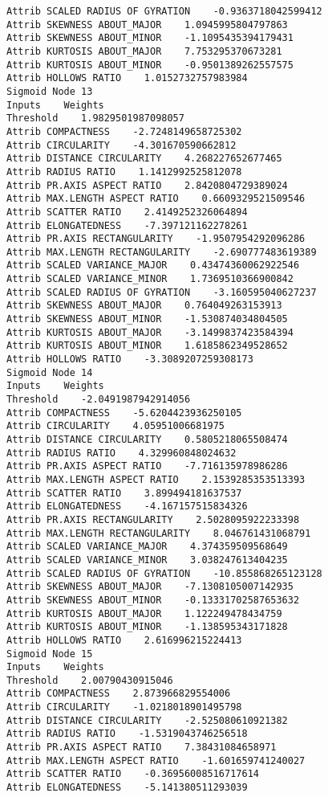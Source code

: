 \documentclass[
	article,			%
	11pt,				%
	oneside,			%
	a4paper,			%
	english,			%
	brazil,				%
	sumario=tradicional
	]{abntex2}
\begin{document}
\begin{lstlisting}
Attrib SCALED RADIUS OF GYRATION    -0.9363718042599412
Attrib SKEWNESS ABOUT_MAJOR    1.0945995804797863
Attrib SKEWNESS ABOUT_MINOR    -1.1095435394179431
Attrib KURTOSIS ABOUT_MAJOR    7.753295370673281
Attrib KURTOSIS ABOUT_MINOR    -0.9501389262557575
Attrib HOLLOWS RATIO    1.0152732757983984
Sigmoid Node 13
Inputs    Weights
Threshold    1.9829501987098057
Attrib COMPACTNESS    -2.7248149658725302
Attrib CIRCULARITY    -4.301670590662812
Attrib DISTANCE CIRCULARITY    4.268227652677465
Attrib RADIUS RATIO    1.1412992525812078
Attrib PR.AXIS ASPECT RATIO    2.8420804729389024
Attrib MAX.LENGTH ASPECT RATIO    0.6609329521509546
Attrib SCATTER RATIO    2.4149252326064894
Attrib ELONGATEDNESS    -7.397121162278261
Attrib PR.AXIS RECTANGULARITY    -1.9507954292096286
Attrib MAX.LENGTH RECTANGULARITY    -2.690777483619389
Attrib SCALED VARIANCE_MAJOR    0.43474360062922546
Attrib SCALED VARIANCE_MINOR    1.7369510366900842
Attrib SCALED RADIUS OF GYRATION    -3.160595040627237
Attrib SKEWNESS ABOUT_MAJOR    0.764049263153913
Attrib SKEWNESS ABOUT_MINOR    -1.530874034804505
Attrib KURTOSIS ABOUT_MAJOR    -3.1499837423584394
Attrib KURTOSIS ABOUT_MINOR    1.6185862349528652
Attrib HOLLOWS RATIO    -3.3089207259308173
Sigmoid Node 14
Inputs    Weights
Threshold    -2.0491987942914056
Attrib COMPACTNESS    -5.6204423936250105
Attrib CIRCULARITY    4.05951006681975
Attrib DISTANCE CIRCULARITY    0.5805218065508474
Attrib RADIUS RATIO    4.329960848024632
Attrib PR.AXIS ASPECT RATIO    -7.716135978986286
Attrib MAX.LENGTH ASPECT RATIO    2.1539285353513393
Attrib SCATTER RATIO    3.899494181637537
Attrib ELONGATEDNESS    -4.167157515834326
Attrib PR.AXIS RECTANGULARITY    2.5028095922233398
Attrib MAX.LENGTH RECTANGULARITY    8.046761431068791
Attrib SCALED VARIANCE_MAJOR    4.374359509568649
Attrib SCALED VARIANCE_MINOR    3.038247613404235
Attrib SCALED RADIUS OF GYRATION    -10.855868265123128
Attrib SKEWNESS ABOUT_MAJOR    -7.1308105007142935
Attrib SKEWNESS ABOUT_MINOR    -0.13331702587653632
Attrib KURTOSIS ABOUT_MAJOR    1.122249478434759
Attrib KURTOSIS ABOUT_MINOR    -1.138595343171828
Attrib HOLLOWS RATIO    2.616996215224413
Sigmoid Node 15
Inputs    Weights
Threshold    2.00790430915046
Attrib COMPACTNESS    2.873966829554006
Attrib CIRCULARITY    -1.0218018901495798
Attrib DISTANCE CIRCULARITY    -2.525080610921382
Attrib RADIUS RATIO    -1.5319043746256518
Attrib PR.AXIS ASPECT RATIO    7.38431084658971
Attrib MAX.LENGTH ASPECT RATIO    -1.601659741240027
Attrib SCATTER RATIO    -0.36956008516717614
Attrib ELONGATEDNESS    -5.141380511293039

\end{lstlisting}
\end{document}
